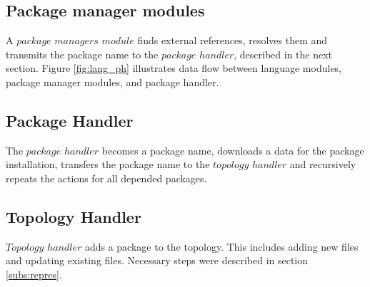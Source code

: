 \subsection{Package manager modules} \label{subs:archpmm}
A $package$ $managers$ $module$ finds external references, resolves them and transmits the package name to the $package$ $handler$, described in the next section.
Figure \ref{fig:lang_ph} illustrates data flow between language modules, package manager modules, and package handler.


\subsection{Package Handler} \label{subs:archph}
The $package$ $handler$ becomes a package name, downloads a data for the package installation, transfers the package name to the $topology$ $handler$ and recursively repeats the actions for all depended packages.

\subsection{Topology Handler} \label{subs:archtop}
$Topology$ $handler$ adds a package to the topology. 
This includes adding new files and updating existing files. 
Necessary steps were described in section \ref{subs:repres}.